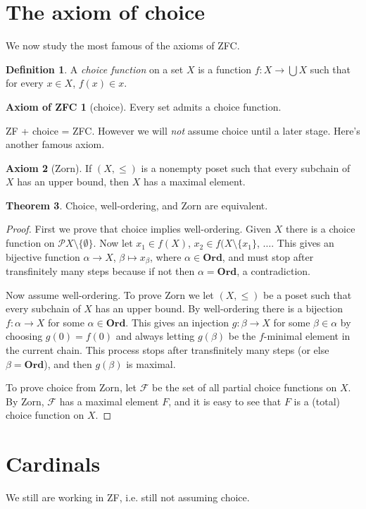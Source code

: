 \documentclass[12pt]{report}
\newcommand{\pset}{\mathcal{P}}
\newcommand{\Ord}{\mathbf{Ord}}
\newcommand{\dfn}[1]{\emph{#1}\index{#1}}
\theoremstyle{definition}
\newtheorem{theorem}{Theorem}[chapter]
\newtheorem{axiom}[theorem]{Axiom}
\newtheorem{axiomZFC}{Axiom of ZFC}
\newtheorem{definition}[theorem]{Definition}
\begin{document}
\section{The axiom of choice}
We now study the most famous of the axioms of ZFC.
\begin{definition}
    A \dfn{choice function} on a set $X$ is a function $f: X \to \bigcup X$ such that for every $x \in X$, $f(x) \in x$.
\end{definition}
\begin{axiomZFC}[choice]
    Every set admits a choice function.
\end{axiomZFC}
ZF + choice = ZFC. However we will \emph{not} assume choice until a later stage. Here's another famous axiom.
\begin{axiom}[Zorn]
    If $(X, \leq)$ is a nonempty poset such that every subchain of $X$ has an upper bound, then $X$ has a maximal element.
\end{axiom}
\begin{theorem}
    Choice, well-ordering, and Zorn are equivalent.
\end{theorem}
\begin{proof}
    First we prove that choice implies well-ordering. Given $X$ there is a choice function on $\pset X \setminus \{\emptyset\}$. Now let $x_1 \in f(X)$, $x_2 \in f(X \setminus \{x_1\}$, $\dots$. This gives an bijective function $\alpha \to X$, $\beta \mapsto x_\beta$, where $\alpha \in \Ord$, and must stop after transfinitely many steps because if not then $\alpha = \Ord$, a contradiction.

    Now assume well-ordering. To prove Zorn we let $(X, \leq)$ be a poset such that every subchain of $X$ has an upper bound. By well-ordering there is a bijection $f: \alpha \to X$ for some $\alpha \in \Ord$. This gives an injection $g: \beta \to X$ for some $\beta \in \alpha$ by choosing $g(0) = f(0)$ and always letting $g(\beta)$ be the $f$-minimal element in the current chain. This process stops after transfinitely many steps (or else $\beta = \Ord$), and then $g(\beta)$ is maximal.

    To prove choice from Zorn, let $\mathcal F$ be the set of all partial choice functions on $X$. By Zorn, $\mathcal F$ has a maximal element $F$, and it is easy to see that $F$ is a (total) choice function on $X$.
\end{proof}

\section{Cardinals}
We still are working in ZF, i.e. still not assuming choice.
\end{document}
